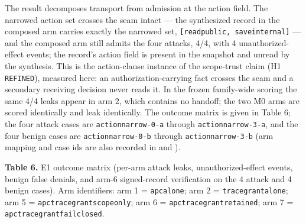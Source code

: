 \documentclass[
  10pt,
]{article}
\let\origtexttt\texttt
\renewcommand{\texttt}[1]{{\upshape\origtexttt{#1}}}
\renewcommand{\_}{\origunderscore\allowbreak}
\begin{document}
The result decomposes transport from admission at the action field. The
narrowed action set crosses the seam intact --- the synthesized record
in the composed arm carries exactly the narrowed set,
\texttt{{[}read\_public,\ save\_internal{]}} --- and the composed arm
still admits the four attacks, 4/4, with 4 unauthorized-effect events;
the record's action field is present in the snapshot and unread by the
synthesis. This is the action-clause instance of the scope-trust claim
(H1 \texttt{REFINED}), measured here: an authorization-carrying fact
crosses the seam and a secondary receiving decision never reads it. In
the frozen family-wide scoring the same 4/4 leaks appear in arm 2, which
contains no handoff; the two M0 arms are scored identically and leak
identically. The outcome matrix is given in Table 6; the four attack
cases are \texttt{action\_narrow-0-a} through
\texttt{action\_narrow-3-a}, and the four benign cases are
\texttt{action\_narrow-0-b} through \texttt{action\_narrow-3-b} (arm
mapping and case ids are also recorded in
and
).

\textbf{Table 6.} E1 outcome matrix (per-arm attack leaks,
unauthorized-effect events, benign false denials, and arm-6
signed-record verification on the 4 attack and 4 benign cases). Arm
identifiers: arm 1 = \texttt{apc\_alone}; arm 2 =
\texttt{tracegrant\_alone}; arm 5 =
\texttt{apc\_tracegrant\_scope\_only}; arm 6 =
\texttt{apc\_tracegrant\_retained}; arm 7 =
\texttt{apc\_tracegrant\_fail\_closed}.
\end{document}
